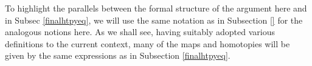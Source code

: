 \documentclass[a4paper,10pt]{amsart}
\begin{document}
%
%


To highlight the parallels between the formal structure of the argument here and in Subsec \ref{finalhtpyeq}, we will use the same notation as in Subsection \ref{} for the analogous notions here. As we shall see, having suitably adopted various definitions to the current context, many of the maps and homotopies will be given by the same expressions as in Subsection \ref{finalhtpyeq}.
\end{document}
